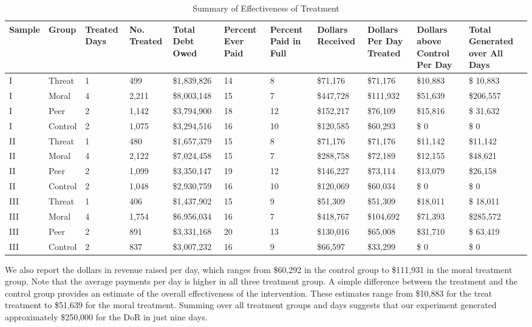 \documentclass[12pt,titlepage]{article}
\begin{document}
\begin{sidewaystable}[ht]
\centering
\begin{tabular}{|p{1.3cm}|p{1.3cm}|p{1.3cm}|p{1.3cm}|p{2cm}|p{1.4cm}|p{1.4cm}|p{1.4cm}|p{1.4cm}|p{1.4cm}|p{1.6cm}|}
  \hline
Sample & Group & Treated Days & No. Treated & Total Debt Owed & Percent Ever Paid & Percent Paid in Full & Dollars Received & Dollars Per Day Treated & Dollars above Control Per Day & Total Generated over All Days \\ 
  \hline
I & Threat & 1 & 499 & \$1,839,826 & 14 &  8 & \$71,176 & \$71,176 & \$10,883 & \$ 10,883 \\ 
  I & Moral & 4 & 2,211 & \$8,003,148 & 15 &  7 & \$447,728 & \$111,932 & \$51,639 & \$206,557 \\ 
  I & Peer & 2 & 1,142 & \$3,794,900 & 18 & 12 & \$152,217 & \$76,109 & \$15,816 & \$ 31,632 \\ 
  I & Control & 2 & 1,075 & \$3,294,516 & 16 & 10 & \$120,585 & \$60,293 & \$     0 & \$      0 \\ 
   \hline
II & Threat & 1 & 480 & \$1,657,379 & 15 &  8 & \$71,176 & \$71,176 & \$11,142 & \$11,142 \\ 
  II & Moral & 4 & 2,122 & \$7,024,458 & 15 &  7 & \$288,758 & \$72,189 & \$12,155 & \$48,621 \\ 
  II & Peer & 2 & 1,099 & \$3,350,147 & 19 & 12 & \$146,227 & \$73,114 & \$13,079 & \$26,158 \\ 
  II & Control & 2 & 1,048 & \$2,930,759 & 16 & 10 & \$120,069 & \$60,034 & \$     0 & \$     0 \\ 
   \hline
III & Threat & 1 & 406 & \$1,437,902 & 15 &  9 & \$51,309 & \$51,309 & \$18,011 & \$ 18,011 \\ 
  III & Moral & 4 & 1,754 & \$6,956,034 & 16 &  7 & \$418,767 & \$104,692 & \$71,393 & \$285,572 \\ 
  III & Peer & 2 & 891 & \$3,331,168 & 20 & 13 & \$130,016 & \$65,008 & \$31,710 & \$ 63,419 \\ 
  III & Control & 2 & 837 & \$3,007,232 & 16 &  9 & \$66,597 & \$33,299 & \$     0 & \$      0 \\ 
   \hline
\end{tabular}
\caption{Summary of Effectiveness of Treatment} 
\label{table:summary}
\end{sidewaystable}

We also report the dollars in revenue raised per day, which ranges
from \$60,292 in the control group to \$111,931 in the moral treatment
group. Note that the average payments per day is higher in all three
treatment group. A simple difference between the treatment and the
control group provides an estimate of the overall effectiveness of the
intervention. These estimates range from \$10,883 for the treat
treatment to \$51,639 for the moral treatment. Summing over all
treatment groups and days suggests that our experiment generated
approximately \$250,000 for the DoR in just nine days.
\end{document}
